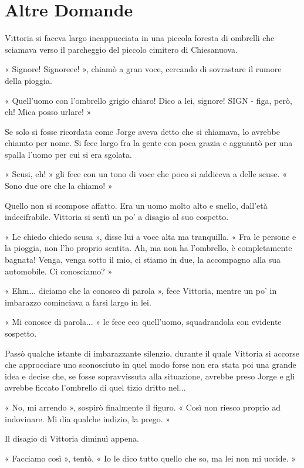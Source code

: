 \chapter{Altre Domande}


Vittoria si faceva largo incappucciata in una piccola foresta di ombrelli che sciamava verso il parcheggio del piccolo cimitero di Chiesanuova.

« Signore! Signoreee! », chiamò a gran voce, cercando di sovrastare il rumore della pioggia.

« Quell'uomo con l'ombrello grigio chiaro! Dico a lei, signore! SIGN - figa, però, eh! Mica posso urlare! »

Se solo si fosse ricordata come Jorge aveva detto che si chiamava, lo avrebbe chiamto per nome. Si fece largo fra la gente con poca grazia e agguantò per una spalla l'uomo per cui si era sgolata.

« Scusi, eh! » gli fece con un tono di voce che poco si addiceva a delle scuse. « Sono due ore che la chiamo! »

Quello non si scompose affatto. Era un uomo molto alto e snello, dall'età indecifrabile. Vittoria si sentì un po' a disagio al suo cospetto.

« Le chiedo chiedo scusa », disse lui a voce alta ma tranquilla. « Fra le persone e la pioggia, non l'ho proprio sentita. Ah, ma non ha l'ombrello, è completamente bagnata! Venga, venga sotto il mio, ci stiamo in due, la accompagno alla sua automobile. Ci conosciamo? »

« Ehm... diciamo che la conosco di parola », fece Vittoria, mentre un po' in imbarazzo cominciava a farsi largo in lei.

« Mi conosce di parola... » le fece eco quell'uomo, squadrandola con evidente sospetto.

Passò qualche istante di imbarazzante silenzio, durante il quale Vittoria si accorse che approcciare uno sconosciuto in quel modo forse non era stata poi una grande idea e decise che, se fosse sopravvissuta alla situazione, avrebbe preso Jorge e gli avrebbe ficcato l'ombrello di quel tizio dritto nel...

« No, mi arrendo », sospirò finalmente il figuro. « Così non riesco proprio ad indovinare. Mi dia qualche indizio, la prego. »

Il disagio di Vittoria diminuì appena.

« Facciamo così », tentò. « Io le dico tutto quello che so, ma lei non mi uccide. »

